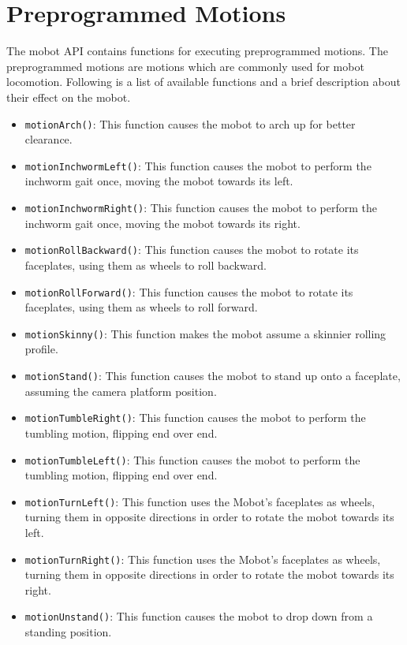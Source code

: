 \documentclass{article}
\begin{document}
\section{\label{sec:preprogrammed_motions}Preprogrammed Motions}
The mobot API contains functions for executing preprogrammed motions. The 
preprogrammed motions are motions which are commonly used for mobot locomotion.
Following is a list of available functions and a brief description about
their effect on the mobot.
\begin{itemize}
\item \texttt{motionArch()}: This function causes the mobot to arch up for better 
clearance.
\item \texttt{motionInchwormLeft()}: This function causes the mobot to perform
  the inchworm gait once, moving the mobot towards its left.
\item \texttt{motionInchwormRight()}: This function causes the mobot to perform
  the inchworm gait once, moving the mobot towards its right.
\item \texttt{motionRollBackward()}: This function causes the mobot to rotate
  its faceplates, using them as wheels to roll backward.
\item \texttt{motionRollForward()}: This function causes the mobot to rotate
  its faceplates, using them as wheels to roll forward.
\item \texttt{motionSkinny()}: This function makes the mobot assume a skinnier
rolling profile.
\item \texttt{motionStand()}: This function causes the mobot to stand up onto a 
  faceplate, assuming the camera platform position.
\item \texttt{motionTumbleRight()}: This function causes the mobot to perform the
tumbling motion, flipping end over end.
\item \texttt{motionTumbleLeft()}: This function causes the mobot to perform the
tumbling motion, flipping end over end.
\item \texttt{motionTurnLeft()}: This function uses the Mobot's faceplates as wheels, turning
  them in opposite directions in order to rotate the mobot towards its left.
\item \texttt{motionTurnRight()}: This function uses the Mobot's faceplates as wheels, turning
  them in opposite directions in order to rotate the mobot towards its right.
\item \texttt{motionUnstand()}: This function causes the mobot to drop down from a standing position.
\end{itemize}
\end{document}
